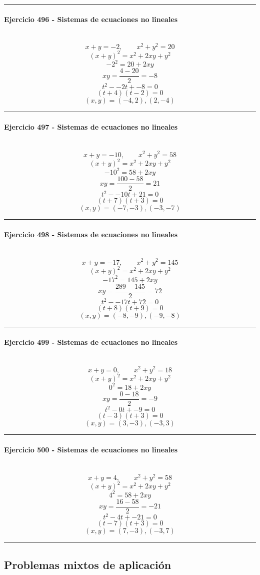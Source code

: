 \documentclass[10pt,a4paper]{article}
\newcommand{\res}[1]{\paragraph{#1}\mbox{}\\[-1.2em]}
\begin{document}
\vspace{1mm}\hrule\vspace{2mm}
\res{Ejercicio 496 - Sistemas de ecuaciones no lineales}
\[ x+y=-2,\qquad x^2+y^2=20 \]
\[ (x+y)^2=x^2+2xy+y^2 \]
\[ -2^2=20+2xy \]
\[ xy=\frac{4-20}{2}=-8 \]
\[ t^2--2t+-8=0 \]
\[ (t+4)(t-2)=0 \]
\[ \boxed{(x,y)=(-4,2),(2,-4)} \]
\vspace{1mm}\hrule\vspace{2mm}
\res{Ejercicio 497 - Sistemas de ecuaciones no lineales}
\[ x+y=-10,\qquad x^2+y^2=58 \]
\[ (x+y)^2=x^2+2xy+y^2 \]
\[ -10^2=58+2xy \]
\[ xy=\frac{100-58}{2}=21 \]
\[ t^2--10t+21=0 \]
\[ (t+7)(t+3)=0 \]
\[ \boxed{(x,y)=(-7,-3),(-3,-7)} \]
\vspace{1mm}\hrule\vspace{2mm}
\res{Ejercicio 498 - Sistemas de ecuaciones no lineales}
\[ x+y=-17,\qquad x^2+y^2=145 \]
\[ (x+y)^2=x^2+2xy+y^2 \]
\[ -17^2=145+2xy \]
\[ xy=\frac{289-145}{2}=72 \]
\[ t^2--17t+72=0 \]
\[ (t+8)(t+9)=0 \]
\[ \boxed{(x,y)=(-8,-9),(-9,-8)} \]
\vspace{1mm}\hrule\vspace{2mm}
\res{Ejercicio 499 - Sistemas de ecuaciones no lineales}
\[ x+y=0,\qquad x^2+y^2=18 \]
\[ (x+y)^2=x^2+2xy+y^2 \]
\[ 0^2=18+2xy \]
\[ xy=\frac{0-18}{2}=-9 \]
\[ t^2-0t+-9=0 \]
\[ (t-3)(t+3)=0 \]
\[ \boxed{(x,y)=(3,-3),(-3,3)} \]
\vspace{1mm}\hrule\vspace{2mm}
\res{Ejercicio 500 - Sistemas de ecuaciones no lineales}
\[ x+y=4,\qquad x^2+y^2=58 \]
\[ (x+y)^2=x^2+2xy+y^2 \]
\[ 4^2=58+2xy \]
\[ xy=\frac{16-58}{2}=-21 \]
\[ t^2-4t+-21=0 \]
\[ (t-7)(t+3)=0 \]
\[ \boxed{(x,y)=(7,-3),(-3,7)} \]
\vspace{1mm}\hrule\vspace{2mm}
\subsection{Problemas mixtos de aplicación}
\end{document}
